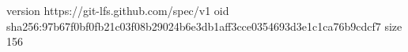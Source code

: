 version https://git-lfs.github.com/spec/v1
oid sha256:97b67f0bf0fb21c03f08b29024b6e3db1aff3cce0354693d3e1c1ca76b9cdcf7
size 156
